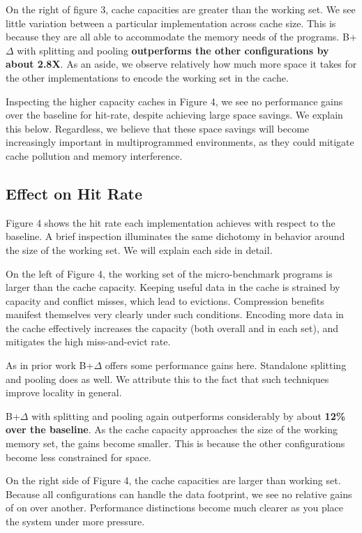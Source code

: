 \documentclass[pageno]{jpaper}
\begin{document}
On the right of figure 3, cache capacities are greater than the working set. We see little variation between a particular implementation across cache size. This is because they are all able to accommodate the memory needs of the programs. B+$\Delta$ with splitting and pooling \textbf{outperforms the other configurations by about 2.8X}. As an aside, we observe relatively how much more space it takes for the other implementations to encode the working set in the cache.

Inspecting the higher capacity caches in Figure 4, we see no performance gains over the baseline for hit-rate, despite achieving large space savings. We explain this below. Regardless, we believe that these space savings will become increasingly important in multiprogrammed environments, as they could mitigate cache pollution and memory interference.

\subsection{Effect on Hit Rate}

Figure 4 shows the hit rate each implementation achieves with respect to the baseline. A brief inspection illuminates the same dichotomy in behavior around the size of the working set. We will explain each side in detail. 

On the left of Figure 4, the working set of the micro-benchmark programs is larger than the cache capacity. Keeping useful data in the cache is strained by capacity and conflict misses, which lead to evictions. Compression benefits manifest themselves very clearly under such conditions. Encoding more data in the cache effectively increases the capacity (both overall and in each set), and mitigates the high miss-and-evict rate.

As in prior work B+$\Delta$ offers some performance gains here. Standalone splitting and pooling does as well. We attribute this to the fact that such techniques improve locality in general.

B+$\Delta$ with splitting and pooling again outperforms considerably by about \textbf{12\% over the baseline}. As the cache capacity approaches the size of the working memory set, the gains become smaller. This is because the other configurations become less constrained for space.

On the right side of Figure 4, the cache capacities are larger than working set. Because all configurations can handle the data footprint, we see no relative gains of on over another. Performance distinctions become much clearer as you place the system under more pressure.
\end{document}
